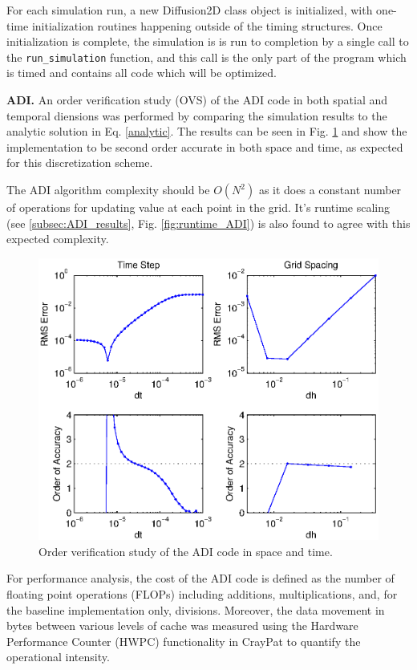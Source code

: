 \documentclass[letterpaper]{article}
\newcommand{\mypar}[1]{{\bf #1.}}
\begin{document}
For each simulation run, a new Diffusion2D class object is initialized, with one-time initialization routines happening outside of the timing structures. Once initialization is complete, the simulation is is run to completion by a single call to the {\tt run\_simulation} function, and this call is the only part of the program which is timed and contains all code which will be optimized. 

\mypar{ADI}
An order verification study (OVS) of the ADI code in both spatial and temporal diensions was performed by comparing the simulation results to the analytic solution in Eq. \eqref{analytic}. The results can be seen in Fig. \ref{fig:OVS_ADI} and show the implementation to be second order accurate in both space and time, as expected for this discretization scheme.

The ADI algorithm complexity should be $O(N^2)$ as it does a constant number of operations for updating value at each point in the grid. It's runtime scaling (see \ref{subsec:ADI_results}, Fig. \ref{fig:runtime_ADI}) is also found to agree with this expected complexity.

\begin{figure}\centering
  \includegraphics[width=\linewidth]{./plots/OVS_ADI.eps}
  \caption{Order verification study of the ADI code in space and time.}
  \label{fig:OVS_ADI}
\end{figure}

For performance analysis, the cost of the ADI code is defined as the number of floating point operations (FLOPs) including additions, multiplications, and, for the baseline implementation only, divisions. Moreover, the data movement in bytes between various levels of cache was measured using the Hardware Performance Counter (HWPC) functionality in CrayPat to quantify the operational intensity.
\end{document}
